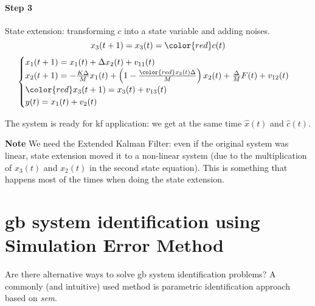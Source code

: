 \begin{exa}
    \paragraph{Step 3} State extension: transforming $c$ into a state variable and adding noises.
    \[
        x_3(t+1) = x_3(t) = {\color{red}c(t)}
    \]
    \[
        \begin{cases}
            x_1(t+1) = x_1(t) + \Delta x_2(t) + v_{11}(t) \\
            x_2(t+1) = -\frac{K\Delta}{M}x_1(t) + \left(1-\frac{{\color{red}x_3(t)} \Delta }{M}\right)x_2(t) + \frac{\Delta}{M}F(t) + v_{12}(t) \\
            {\color{red}x_3(t+1) = x_3(t) + v_{13}(t)} \\
            y(t) = x_1(t) + v_2(t)
        \end{cases}
    \]

    The system is ready for \gls{kf} application: we get at the same time $\hat{x}(t)$ and $\hat{c}(t)$.

    \textbf{Note} We need the Extended Kalman Filter: even if the original system was linear, state extension moved it to a non-linear system (due to the multiplication of $x_3(t)$ and $x_2(t)$ in the second state equation). This is something that happens most of the times when doing the state extension.
\end{exa}


\section{\gls{gb} system identification using Simulation Error Method}

Are there alternative ways to solve \acrlong{gb} system identification problems?
A commonly (and intuitive) used method is parametric identification approach based on \emph{\gls{sem}}.

\begin{figure}[H]
    \centering
\end{figure}

